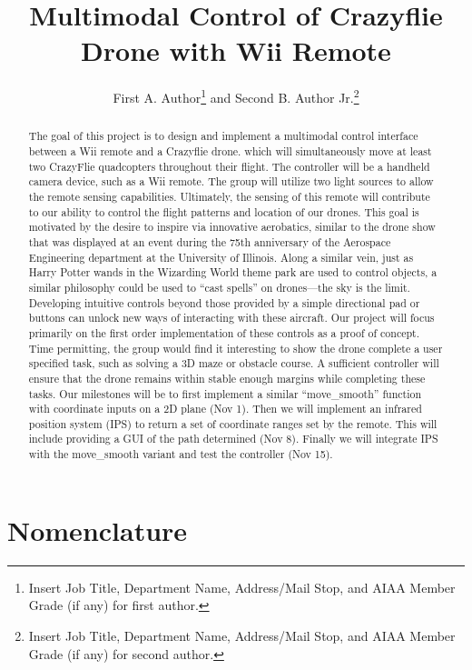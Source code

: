 \documentclass[conf]{new-aiaa}
\title{Multimodal Control of Crazyflie Drone with Wii Remote}
\author{First A. Author\footnote{Insert Job Title, Department Name, Address/Mail Stop, and AIAA Member Grade (if any) for first author.} and Second B. Author Jr.\footnote{Insert Job Title, Department Name, Address/Mail Stop, and AIAA Member Grade (if any) for second author.}}
\affil{Business or Academic Affiliation 1, City, State, Zip Code}
\begin{document}
\maketitle

\begin{abstract}
The goal of this project is to design and implement a multimodal control interface between a Wii remote and a Crazyflie drone. which will simultaneously move at least two CrazyFlie quadcopters throughout their flight. The controller will be a handheld camera device, such as a Wii remote. The group will utilize two light sources to allow the remote sensing capabilities. Ultimately, the sensing of this remote will contribute to our ability to control the flight patterns and location of our drones. This goal is motivated by the desire to inspire via innovative aerobatics, similar to the drone show that was displayed at an event during the 75th anniversary of the Aerospace Engineering department at the University of Illinois.  Along a similar vein, just as Harry Potter wands in the Wizarding World theme park are used to control objects, a similar philosophy could be used to “cast spells” on drones—the sky is the limit.  Developing intuitive controls beyond those provided by a simple directional pad or buttons can unlock new ways of interacting with these aircraft. Our project will focus primarily on the first order implementation of these controls as a proof of concept. Time permitting, the group would find it interesting to show the drone complete a user specified task, such as solving a 3D maze or obstacle course. A sufficient controller will ensure that the drone remains within stable enough margins while completing these tasks. Our milestones will be to first implement a similar “move_smooth”  function with coordinate inputs on a 2D plane (Nov 1). Then  we will implement an infrared position system (IPS) to return a set of coordinate ranges set by the remote. This will include providing a GUI of the path determined (Nov 8). Finally we will  integrate IPS with the move_smooth variant and test the controller (Nov 15).
\end{abstract}

\section{Nomenclature}
\end{document}
